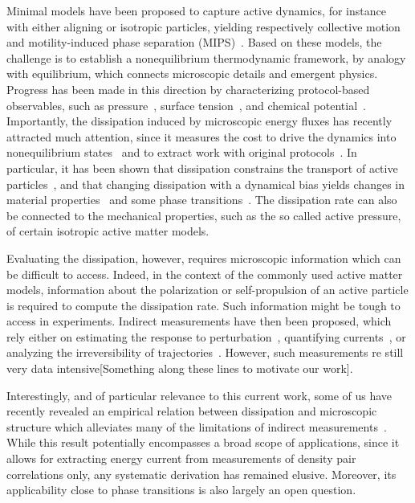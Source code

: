 \documentclass[amsmath,preprintnumbers,10pt,nofootinbib,prl,twocolumn]{revtex4-1}
\begin{document}
Minimal models have been proposed to capture active dynamics, for instance with either aligning or isotropic particles, yielding respectively collective motion~\cite{Vicsek1995, Chate2020} and motility-induced phase separation (MIPS)~\cite{Fily2012, Cates2015}. Based on these models, the challenge is to establish a nonequilibrium thermodynamic framework, by analogy with equilibrium, which connects microscopic details and emergent physics. Progress has been made in this direction by characterizing protocol-based observables, such as pressure~\cite{Marchetti2014, Brady2014, Solon2015}, surface tension~\cite{Speck2015, Paliwal2017, Zakine2020}, and chemical potential~\cite{Paliwal2018, Guioth2019}. Importantly, the dissipation induced by microscopic energy fluxes has recently attracted much attention, since it measures the cost to drive the dynamics into nonequilibrium states~\cite{Shim2016, Suma2017, Junco2018, Spinney2018, Murrell2018, Murrell2019, Markovich2020} and to extract work with original protocols~\cite{Zakine2017, Martin2018, Pietzonka2019, Liao2020, Ekeh2020, Kroy2020}. In particular, it has been shown that dissipation constrains the transport of active particles~\cite{Suri2019, Suri2020}, and that changing dissipation with a dynamical bias yields changes in material properties~\cite{Suri2019} and some phase transitions~\cite{Nemoto2019, Suri2020,GrandPre2020}. The dissipation rate can also be connected to the mechanical properties, such as the so called active pressure, of certain isotropic active matter models. 

Evaluating the dissipation, however, requires microscopic information which can be difficult to access. Indeed, in the context of the commonly used active matter models, information about the polarization or self-propulsion of an active particle is required to compute the dissipation rate. Such information might be tough to access in experiments. Indirect measurements have then been proposed, which rely either on estimating the response to perturbation~\cite{Sasa2005, Toyabe2010, Ahmed2016, Nardini2017, Mizuno2018}, quantifying currents~\cite{Barato2015, Gingrich2016, Gladrow2016, Li2019}, or analyzing the irreversibility of trajectories~\cite{Roldan2018, Parrondo2019}. However, such measurements re still very data intensive[Something along these lines to motivate our work]. 

Interestingly, and of particular relevance to this current work, some of us have recently revealed an empirical relation between dissipation and microscopic structure which alleviates many of the limitations of indirect measurements~\cite{Suri2019}. While this result potentially encompasses a broad scope of applications, since it allows for extracting energy current from measurements of density pair correlations only, any systematic derivation has remained elusive. Moreover, its applicability close to phase transitions is also  largely an open question.
\end{document}

